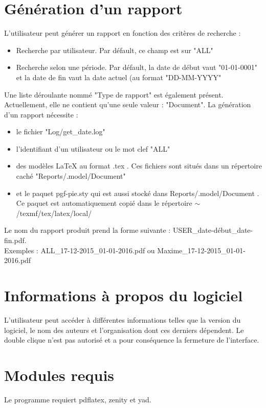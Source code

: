 \documentclass[a4paper,11pt]{article}
\begin{document}
\section{Génération d'un rapport}
	L'utilisateur peut générer un rapport en fonction des critères de recherche :
	\begin{itemize}
		\item Recherche par utilisateur. Par défault, ce champ est sur "ALL"
		\item Recherche selon une période. Par défault, la date de début vaut "01-01-0001" et la date de fin vaut la date actuel (au format "DD-MM-YYYY"
	\end{itemize}
	Une liste déroulante nommé "Type de rapport" est également présent. Actuellement, elle ne contient qu'une seule valeur : "Document".
	La génération d'un rapport nécessite :
	\begin{itemize}
		\item le fichier "Log/get\_date.log"
		\item l'identifiant d'un utilisateur ou le mot clef "ALL"
		\item des modèles LaTeX au format .tex . Ces fichiers sont situés dans un répertoire caché "Reports/.model/Document"
		\item et le paquet pgf-pie.sty qui est aussi stocké dans Reports/.model/Document . Ce paquet est automatiquement copié dans le répertoire $\sim$/texmf/tex/latex/local/
	\end{itemize}
	Le nom du rapport produit prend la forme suivante : USER\_date-début\_date-fin.pdf. \\ 
	Exemples : ALL\_17-12-2015\_01-01-2016.pdf ou Maxime\_17-12-2015\_01-01-2016.pdf

\section{Informations à propos du logiciel}
	L'utilisateur peut accéder à différentes informations telles que la version du logiciel, le nom des auteurs et l'organisation dont ces derniers dépendent. 
	Le double clique n'est pas autorisé et a pour conséquence la fermeture de l'interface.

\section{Modules requis}
	Le programme requiert pdflatex, zenity et yad.
\end{document}
